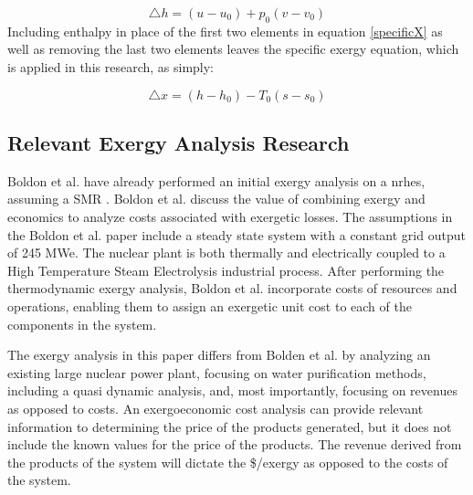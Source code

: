 \begin{equation}
\triangle h=(u-u_0)+p_0(v-v_0)
\end{equation} Including enthalpy in place of the first two elements in equation \ref{specificX} as well as removing the last two elements leaves the specific exergy equation, which is applied in this research, as simply:

\begin{equation}
\triangle x=(h-h_0)-T_0(s-s_0)
\end{equation}

\subsection{Relevant Exergy Analysis Research}
Boldon et al. have already performed an initial exergy analysis on a \ac{nrhes}, assuming a SMR \cite{Boldon}. Boldon et al. discuss the value of combining exergy and economics to analyze costs associated with exergetic losses. The assumptions in the Boldon et al. paper include a steady state system with a constant grid output of 245 MWe.  The nuclear plant is both thermally and electrically coupled to a High Temperature Steam Electrolysis industrial process. After performing the thermodynamic exergy analysis, Boldon et al. incorporate costs of resources and operations, enabling them to assign an exergetic unit cost to each of the components in the system.

The exergy analysis in this paper differs from Bolden et al. by analyzing an existing large nuclear power plant, focusing on water purification methods, including a quasi dynamic analysis, and, most importantly, focusing on revenues as opposed to costs.  An exergoeconomic cost analysis can provide relevant information to determining the price of the products generated, but it does not include the known values for the price of the products. The revenue derived from the products of the system will dictate the \$/exergy as opposed to the costs of the system.


